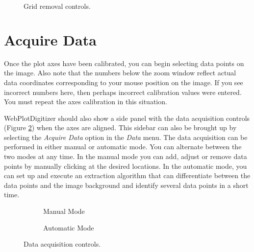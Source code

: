 \documentclass[letterpaper, 11pt]{article}
\begin{document}
\begin{figure}
\begin{center}
\caption{Grid removal controls.}
\label{fig:gridRemoval}
\end{center}
\end{figure}

\section{Acquire Data}

Once the plot axes have been calibrated, you can begin selecting data points on the image. Also note that the numbers below the zoom window reflect actual data coordinates corresponding to your mouse position on the image. If you see incorrect numbers here, then perhaps incorrect calibration values were entered. You must repeat the axes calibration in this situation. 

WebPlotDigitizer should also show a side panel with the data acquisition controls (Figure \ref{fig:acquireData}) when the axes are aligned. This sidebar can also be brought up by selecting the \emph{Acquire Data} option in the \emph{Data} menu. The data acquisition can be performed in either manual or automatic mode. You can alternate between the two modes at any time. In the manual mode you can add, adjust or remove data points by manually clicking at the desired locations. In the automatic mode, you can set up and execute an extraction algorithm that can differentiate between the data points and the image background and identify several data points in a short time.

\begin{figure}
\centering
{
\begin{subfigure}{0.35\textwidth}
\caption{Manual Mode}
\end{subfigure}
\hspace{5mm}
\begin{subfigure}{0.4\textwidth}
\caption{Automatic Mode}
\end{subfigure}
}
\caption{Data acquisition controls.}
\label{fig:acquireData}
\end{figure}
\end{document}
